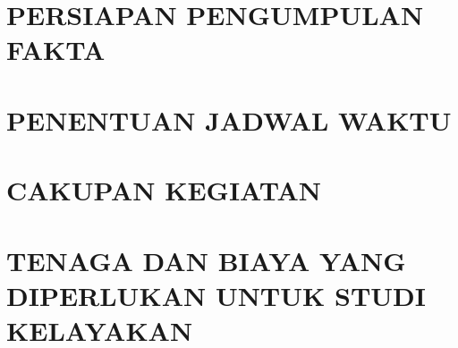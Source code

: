 \documentclass[pdftex,12pt, oneside]{article}
\begin{document}
\section{PERSIAPAN PENGUMPULAN FAKTA}


\section{PENENTUAN JADWAL WAKTU}



\section{CAKUPAN KEGIATAN}


\section{TENAGA DAN BIAYA YANG DIPERLUKAN UNTUK STUDI KELAYAKAN}

\end{document}
